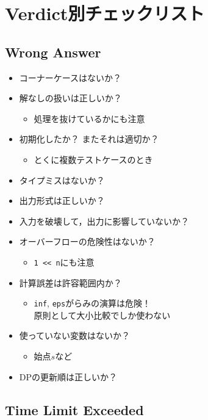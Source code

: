 \section{Verdict別チェックリスト}
\subsection{Wrong Answer}

\begin{itemize}
\item コーナーケースはないか？
\item 解なしの扱いは正しいか？
  \begin{itemize}
  \item 処理を抜けているかにも注意
  \end{itemize}
\item 初期化したか？ またそれは適切か？
  \begin{itemize}
  \item とくに複数テストケースのとき
  \end{itemize}
\item タイプミスはないか？
\item 出力形式は正しいか？
\item 入力を破壊して，出力に影響していないか？
\item オーバーフローの危険性はないか？
  \begin{itemize}
  \item \verb|1 << n|にも注意
  \end{itemize}
\item 計算誤差は許容範囲内か？
  \begin{itemize}
  \item \verb|inf|, \verb|eps|がらみの演算は危険！ \\
    原則として大小比較でしか使わない
  \end{itemize}
\item 使っていない変数はないか？
  \begin{itemize}
  \item 始点$s$など
  \end{itemize}
\item DPの更新順は正しいか？
\end{itemize}

\subsection{Time Limit Exceeded}

